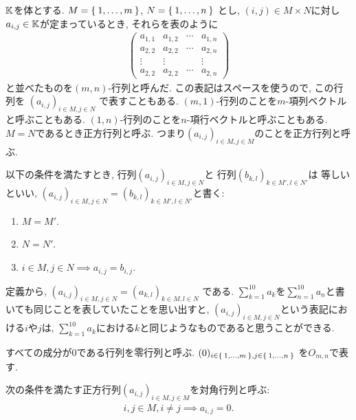 $\mathbb{K}$を体とする.
$M=\Set{1,\ldots,m}$,
$N=\Set{1,\ldots,n}$
とし,
$(i,j)\in M\times N$に対し$a_{i,j}\in \mathbb{K}$が定まっているとき,
それらを表のように
\begin{align*}
\begin{pmatrix}
a_{1,1} &a_{1,2} & \cdots & a_{1,n}\\
a_{2,2} &a_{2,2} & \cdots & a_{2,n}\\
\vdots &\vdots &   & \vdots\\
a_{2,2} &a_{2,2} & \cdots & a_{2,n}
\end{pmatrix}
\end{align*}
と並べたものを$(m,n)$-行列と呼んだ.
この表記はスペースを使うので,
この行列を
$(a_{i,j})_{i\in M, j\in N}$
で表すこともある.
$(m,1)$-行列のことを$m$-項列ベクトルと呼ぶこともある.
$(1,n)$-行列のことを$n$-項行ベクトルと呼ぶこともある.
$M=N$であるとき正方行列と呼ぶ.
つまり$(a_{i,j})_{i\in M, j\in M}$のことを正方行列と呼ぶ.

\begin{definition}
以下の条件を満たすとき,
行列$(a_{i,j})_{i\in M, j\in N}$と
行列$(b_{k,l})_{k\in M', l\in N'}$は
等しいといい,
$(a_{i,j})_{i\in M, j\in N}=(b_{k,l})_{k\in M', l\in N'}$と書く:
\begin{enumerate}
\item $M=M'$.
\item $N=N'$.
\item $i\in M,j\in N\implies a_{i,j}=b_{i,j}$.
\end{enumerate}
\end{definition}

\begin{remark}
定義から,
$(a_{i,j})_{i\in M, j\in N}=(a_{k,l})_{k\in M, l\in N}$
である.
$\sum_{k=1}^{10}a_k$を$\sum_{n=1}^{10}a_n$と書いても同じことを表していたことを思い出すと,
$(a_{i,j})_{i\in M, j\in N}$という表記における$i$や$j$は,
$\sum_{k=1}^{10}a_k$における$k$と同じようなものであると思うことができる.
\end{remark}

すべての成分が$0$である行列を零行列と呼ぶ.
$(0)_{i\in \Set{1,\ldots,m}, j\in \Set{1,\ldots,n}}$
を$O_{m,n}$で表す.

\begin{definition}
次の条件を満たす正方行列$(a_{i,j})_{i\in M, j\in M}$を対角行列と呼ぶ:
\begin{align*}
i,j\in M, i\neq j \implies a_{i,j}=0.
\end{align*}
\end{definition}


